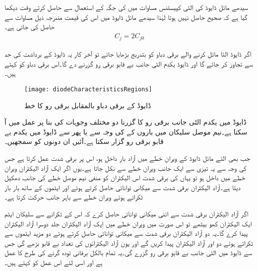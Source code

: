 سیدھے مائل ڈایوڈ کی الٹی کپیسٹنس   مساوات   میں کی جگہ  کے استعمال سے حاصل کرتے وقت دیکھا گیا ہے کہ صحیح حاصل نہیں ہوتا لہٰذا سیدھے مائل ڈایوڈ میں اس کی قیمت مندرجہ ذیل مساوات سے حاصل کی جاتی ہے۔
\begin{align}
C_j = 2 C_{j0}
\end{align}

\label{حصہ_بے_قابو_صورت}
اگر ڈایوڈ الٹا مائل کرنے والے برقی دباو کو بتدریج بڑھایا جائے تو آخر کار یہ ڈایوڈ کے برداشت کی حد سے تجاوز کر جائے گا اور ڈایوڈ یکدم الٹی جانب بے قابو برقی رو گزرنے دے گا۔اس برقی دباو کو      کہتے ہیں۔
\begin{figure}
\centering
\texttt{[image: diodeCharacteristicsRegions]}
\caption{ڈایوڈ کے برقی دباو بالمقابل برقی رو کا خط}
\label{شکل_بے_قابو_ڈایوڈ}
\end{figure}
ڈایوڈ میں یکدم الٹی جانب برقی رو کا گزرنا دو مختلف وجوہات کی بنا پر عمل میں آ سکتا ہے۔نیم موصل سلیکان میں باروں کے  کی وجہ سے یا پھر   سے  ڈایوڈ میں یکدم بے قابو برقی رو گزار سکتا ہے۔آئیں ان دونوں کو سمجھیں۔

جب بھی الٹے مائل ڈایوڈ کے ویران خطے میں آزاد بار داخل ہو، اس پر برقی شدت  عمل کرتا ہے جس کی وجہ سے یہ تیزی سے ایک جانب ویران خطے سے نکل جاتا ہے۔یوں اگر ایک آزاد الیکٹران ویران خطے میں داخل ہو تو یہاں کی برقی شدت  اس الیکٹران کو منفی نیم موصل خطے کی جانب دھکیل دیتا ہے۔آزاد الیکٹران برقی شدت سے میکانی توانائی حاصل کرتے ہوئے اور ایٹموں کے ساتھ بار بار ٹکراتے ہوئے ویران خطے سے باہر جانب حرکت کرتا ہے۔

اگر آزاد الیکٹران برقی شدت سے اتنی میکانی توانائی حاصل کرے کہ اس کے ٹکرانے سے سلیکان ایٹم ایک الیکٹران کھو بیٹھے تو اس صورت میں ویران خطے میں ایک آزاد الیکٹران جلد دوسرا آزاد الیکٹران پیدا کرے گا۔یہ دو آزاد الیکٹران برقی شدت سے میکانی توانائی حاصل کرتے ہوئے دو مزید ایٹموں سے ٹکراتے ہوئے دو اور آزاد الیکٹران پیدا کریں گے اور یوں آزاد الیکٹرانوں کی تعداد بے قابو بڑھے گی جس سے ڈایوڈ میں الٹی جانب بے قابو برقی رو گزرے گی۔یہ تمام بالکل برفانی تودہ گرنے کی طرح کا عمل ہے اور اسی لئے اس عمل کو  کہتے ہیں۔

